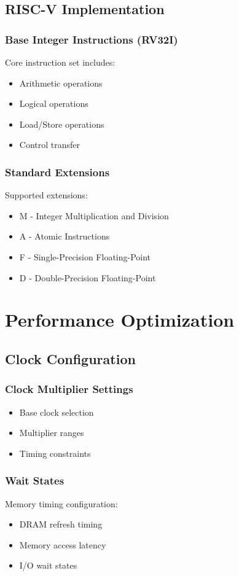 \documentclass[a4paper,11pt]{book}
\begin{document}
\section{RISC-V Implementation}
\subsection{Base Integer Instructions (RV32I)}
Core instruction set includes:
\begin{itemize}
    \item Arithmetic operations
    \item Logical operations
    \item Load/Store operations
    \item Control transfer
\end{itemize}

\subsection{Standard Extensions}
Supported extensions:
\begin{itemize}
    \item M - Integer Multiplication and Division
    \item A - Atomic Instructions
    \item F - Single-Precision Floating-Point
    \item D - Double-Precision Floating-Point
\end{itemize}

\chapter{Performance Optimization}
\section{Clock Configuration}
\subsection{Clock Multiplier Settings}
\begin{itemize}
    \item Base clock selection
    \item Multiplier ranges
    \item Timing constraints
\end{itemize}

\subsection{Wait States}
Memory timing configuration:
\begin{itemize}
    \item DRAM refresh timing
    \item Memory access latency
    \item I/O wait states
\end{itemize}
\end{document}
